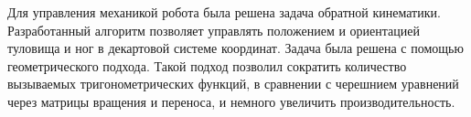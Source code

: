 Для управления механикой робота была решена задача обратной кинематики. Разработанный алгоритм позволяет управлять положением и ориентацией туловища и ног в декартовой системе координат. Задача была решена с помощью геометрического подхода. Такой подход позволил сократить количество вызываемых тригонометрических функций, в сравнении с черешнием уравнений через матрицы вращения и переноса, и немного увеличить производительность. 